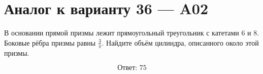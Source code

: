 \documentclass[12pt,a4paper]{article}
\begin{document}
\section*{Аналог к варианту 36 — A02}

В основании прямой призмы лежит прямоугольный треугольник с катетами \(6\) и \(8\). Боковые рёбра призмы равны \(\frac3\pi\). Найдите объём цилиндра, описанного около этой призмы.

\begin{center}
\end{center}

\[
\boxed{\text{Ответ: }75}
\]
\end{document}

